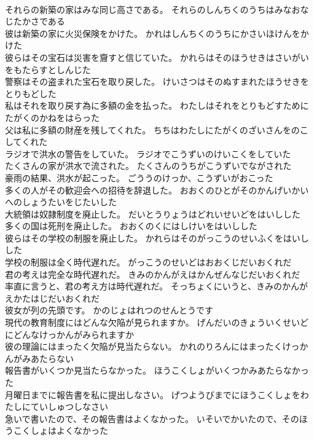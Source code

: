 \documentclass[8pt]{extreport}
\begin{document}
\begin{CJK}{UTF8}{min}
\\	それらの新築の家はみな同じ高さである。	それらのしんちくのうちはみなおなじたかさである 
\\	彼は新築の家に火災保険をかけた。	かれはしんちくのうちにかさいほけんをかけた 
\\	彼らはその宝石は災害を齎すと信じていた。	かれらはそのほうせきはさいがいをもたらすとしんじた 
\\	警察はその盗まれた宝石を取り戻した。	けいさつはそのぬすまれたほうせきをとりもどした 
\\	私はそれを取り戻す為に多額の金を払った。	わたしはそれをとりもどすためにたがくのかねをはらった 
\\	父は私に多額の財産を残してくれた。	ちちはわたしにたがくのざいさんをのこしてくれた 
\\	ラジオで洪水の警告をしていた。	ラジオでこうずいのけいこくをしていた 
\\	たくさんの家が洪水で流された。	たくさんのうちがこうずいでながされた 
\\	豪雨の結果、洪水が起こった。	ごううのけっか、こうずいがおこった 
\\	多くの人がその歓迎会への招待を辞退した。	おおくのひとがそのかんげいかいへのしょうたいをじたいした 
\\	大統領は奴隷制度を廃止した。	だいとうりょうはどれいせいどをはいしした 
\\	多くの国は死刑を廃止した。	おおくのくにはしけいをはいしした 
\\	彼らはその学校の制服を廃止した。	かれらはそのがっこうのせいふくをはいしした 
\\	学校の制服は全く時代遅れだ。	がっこうのせいどはおおくじだいおくれだ 
\\	君の考えは完全な時代遅れだ。	きみのかんがえはかんぜんなじだいおくれだ 
\\	率直に言うと、君の考え方は時代遅れだ。	そっちょくにいうと、きみのかんがえかたはじだいおくれだ 
\\	彼女が列の先頭です。	かのじょはれつのせんとうです 
\\	現代の教育制度にはどんな欠陥が見られますか。	げんだいのきょういくせいどにどんなけっかんがみられますか 
\\	彼の理論にはまったく欠陥が見当たらない。	かれのりろんにはまったくけっかんがみあたらない 
\\	報告書がいくつか見当たらなかった。	ほうこくしょがいくつかみあたらなかった 
\\	月曜日までに報告書を私に提出しなさい。	げつようびまでにほうこくしょをわたしにていしゅつしなさい 
\\	急いで書いたので、その報告書はよくなかった。	いそいでかいたので、そのほうこくしょはよくなかった 

\end{CJK}
\end{document}
